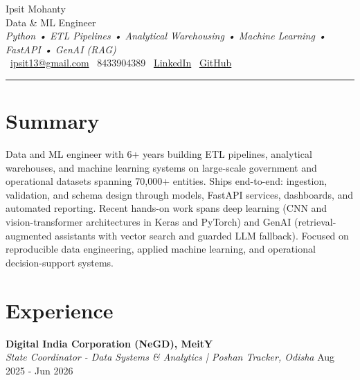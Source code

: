 \documentclass[a4paper,10pt]{article}
\begin{document}
\sloppy

\begin{center}
  {\Huge Ipsit Mohanty} \\[2.5mm]
  {\Large Data \& ML Engineer} \\[1mm]
  {\small \textit{Python • ETL Pipelines • Analytical Warehousing • Machine Learning • FastAPI • GenAI (RAG)}} \\[2mm]
  \faEnvelope~\href{mailto:ipsit13@gmail.com}{ipsit13@gmail.com} \quad
  \faPhone~8433904389 \quad
  \faLinkedin~\href{%%TRACKER_LI%%}{LinkedIn} \quad
  \faGithub~\href{%%TRACKER_GH%%}{GitHub}
\end{center}
\noindent\rule{\textwidth}{0.2pt}

\section*{Summary}
Data and ML engineer with 6+ years building ETL pipelines, analytical warehouses, and machine
learning systems on large-scale government and operational datasets spanning 70,000+ entities. Ships
end-to-end: ingestion, validation, and schema design through models, FastAPI services, dashboards,
and automated reporting. Recent hands-on work spans deep learning (CNN and vision-transformer
architectures in Keras and PyTorch) and GenAI (retrieval-augmented assistants with vector search
and guarded LLM fallback). Focused on reproducible data engineering, applied machine learning, and
operational decision-support systems.

\section*{Experience}

{\large\textbf{Digital India Corporation (NeGD), MeitY}} \\
\textit{State Coordinator - Data Systems \& Analytics | Poshan Tracker, Odisha} \hfill {\datefont\small Aug 2025 - Jun 2026}
\end{document}
